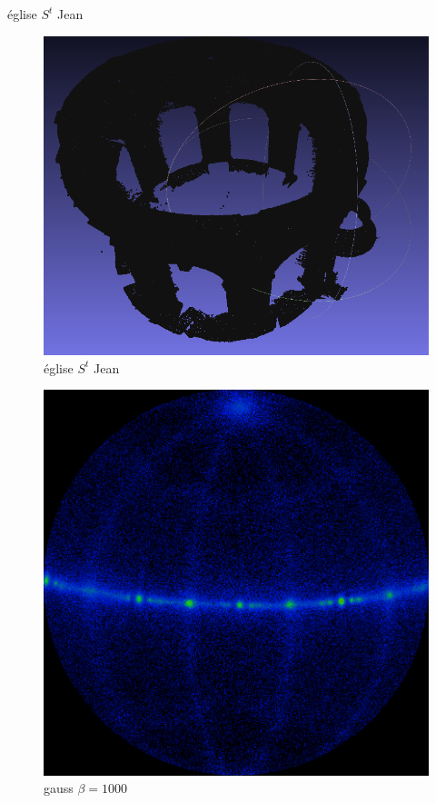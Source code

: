 \documentclass[11pt]{beamer}
\begin{document}
\begin{frame}{église $S^t$ Jean}
\begin{multicols}{2}
\begin{figure}[hbtp]
\centering
\includegraphics[width=\columnwidth]{2014-02-28-102010_713x591_scrot.png}
\caption{église $S^t$ Jean}
\end{figure}

\columnbreak

\begin{figure}[hbtp]
\centering
\includegraphics[width=\columnwidth]{gauss_st_jean.png}
\caption{gauss $\beta=1000$}
\end{figure}
\end{multicols}

\end{frame}
\end{document}
